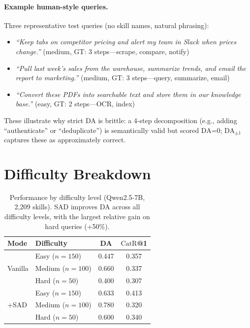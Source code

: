 \documentclass[11pt]{article}
\newcommand{\catrecall}{\text{CatR}}
\begin{document}
\paragraph{Example human-style queries.}
Three representative test queries (no skill names, natural phrasing):
\begin{itemize}[nosep,leftmargin=*]
\item \textit{``Keep tabs on competitor pricing and alert my team in Slack when prices change.''} (medium, GT: 3 steps---scrape, compare, notify)
\item \textit{``Pull last week's sales from the warehouse, summarize trends, and email the report to marketing.''} (medium, GT: 3 steps---query, summarize, email)
\item \textit{``Convert these PDFs into searchable text and store them in our knowledge base.''} (easy, GT: 2 steps---OCR, index)
\end{itemize}
These illustrate why strict DA is brittle: a 4-step decomposition (e.g., adding ``authenticate'' or ``deduplicate'') is semantically valid but scored DA=0; DA$_{\pm 1}$ captures these as approximately correct.

\section{Difficulty Breakdown}
\label{app:difficulty}

\begin{table}[h]
\centering
\small
\begin{tabular}{llcc}
\toprule
\textbf{Mode} & \textbf{Difficulty} & \textbf{DA} & $\catrecall$\textbf{@1} \\
\midrule
\multirow{3}{*}{Vanilla} & Easy ($n{=}150$) & 0.447 & 0.357 \\
& Medium ($n{=}100$) & 0.660 & 0.337 \\
& Hard ($n{=}50$) & 0.400 & 0.307 \\
\midrule
\multirow{3}{*}{+SAD} & Easy ($n{=}150$) & 0.633 & 0.413 \\
& Medium ($n{=}100$) & 0.780 & 0.320 \\
& Hard ($n{=}50$) & 0.600 & 0.340 \\
\bottomrule
\end{tabular}
\caption{Performance by difficulty level (Qwen2.5-7B, 2{,}209 skills). SAD improves DA across all difficulty levels, with the largest relative gain on hard queries (+50\%).}
\label{tab:difficulty}
\end{table}
\end{document}

